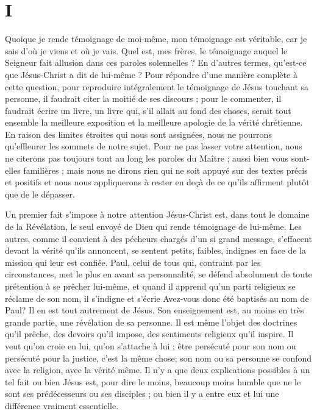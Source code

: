 \section{I}

\Og{} Quoique je rende témoignage de moi-même, mon témoignage est véritable, car je sais d’où je viens et où je vais.\Fg{} Quel est, mes frères, le témoignage auquel le Seigneur fait allusion dans ces paroles solennelles ? En d’autres termes, qu’est-ce que Jésus-Christ a dit de lui-même ? \ocadr{} Pour répondre d’une manière complète à cette question, pour reproduire intégralement le témoignage de Jésus touchant sa personne, il faudrait citer la moitié de ses discours ; pour le commenter, il faudrait écrire un livre, un livre qui, s’il allait au fond des choses, serait tout ensemble la meilleure exposition et la meilleure apologie de la vérité chrétienne. En raison des limites étroites qui nous sont assignées, nous ne pourrons qu’effleurer les sommets de notre sujet. Pour ne pas lasser votre attention, nous ne citerons pas toujours tout au long les paroles du Maître ; aussi bien vous sont-elles familières ; mais nous ne dirons rien qui ne soit appuyé sur des textes précis et positifs et nous nous appliquerons à rester en deçà de ce qu’ils affirment plutôt que de le dépasser.

Un premier fait s’impose à notre attention\frcolon{} Jésus-Christ est, dans tout le domaine de la Révélation, le seul envoyé de Dieu qui rende témoignage de lui-même. Les autres, comme il convient à des pécheurs chargés d’un si grand message, s’effacent devant la vérité qu’ils annoncent, se sentent petits, faibles, indignes en face de la mission qui leur est confiée. Paul, celui de tous qui, contraint par les circonstances, met le plus en avant sa personnalité, se défend absolument de toute prétention à se prêcher lui-même, et quand il apprend qu’un parti religieux se réclame de son nom, il s’indigne et s’écrie\frcolon{} \Og{} Avez-vous donc été baptisés au nom de Paul?\Fg{} Il en est tout autrement de Jésus. Son enseignement est, au moins en très grande partie, une révélation de sa personne. Il est même l’objet des doctrines qu’il prêche, des devoirs qu’il impose, des sentiments religieux qu’il inspire. Il veut qu’on croie en lui, qu’on s’attache à lui ; être persécuté pour son nom ou persécuté pour la justice, c’est la même chose; son nom ou sa personne se confond avec la religion, avec la vérité même. Il n’y a que deux explications possibles à un tel fait\frcolon{} ou bien Jésus est, pour dire le moins, beaucoup moins humble que ne le sont ses prédécesseurs ou ses disciples ; ou bien il y a entre eux et lui une différence vraiment essentielle.

